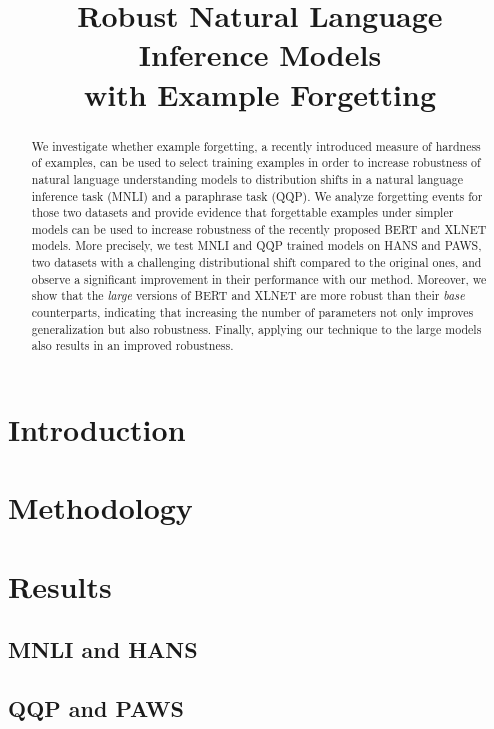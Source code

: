 \documentclass[11pt,a4paper]{article}
\title{Robust Natural Language Inference Models \\ with Example Forgetting}
\begin{document}
\maketitle

\begin{abstract}
We investigate whether example forgetting, a recently introduced measure of hardness of examples, can be used to select training examples in order to increase robustness of natural language understanding models to distribution shifts in a natural language inference task (MNLI) and a paraphrase task (QQP). We analyze forgetting events for those two datasets and provide evidence that forgettable examples under simpler models can be used to increase robustness of the recently proposed BERT and XLNET models. More precisely, we test MNLI and QQP trained models on HANS and PAWS, two datasets with a challenging distributional shift compared to the original ones, and observe a significant improvement in their performance with our method. Moreover, we show that the \emph{large} versions of BERT and XLNET are more robust than their \emph{base} counterparts, indicating that increasing the number of parameters not only improves generalization but also robustness. Finally, applying our technique to the large models also results in an improved robustness.
\end{abstract}

\section{Introduction}


\section{Methodology}


\section{Results}
\label{sec:eval}
\subsection{MNLI and HANS}


\subsection{QQP and PAWS}
\label{sec:paws}

\end{document}
